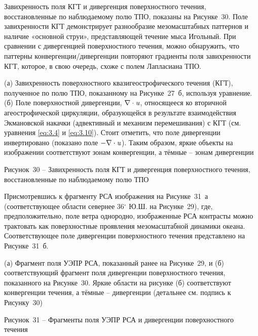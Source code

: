 Завихренность поля КГТ и дивергенция поверхностного течения, восстановленные по наблюдаемому полю ТПО, показаны на Рисунке~30. Поле завихренности КГТ демонстрирует разнообразие мезомасштабных паттернов и наличие «основной струи», представляющей течение мыса Игольный. При сравнении с дивергенцией поверхностного течения, можно обнаружить, что паттерны конвергенции/дивергенции повторяют градиенты поля завихренности КГТ, которое, в свою очередь, схоже с полем Лапласиана ТПО.



(а) Завихренность поверхностного квазигеострофического течения (КГТ), полученное по полю ТПО, показанному на Рисунке~27~б, используя уравнение. (б) Поле поверхностной дивергенции, $\nabla \cdot {\it u}$, относящееся ко вторичной агеострофической циркуляции, образующейся в результате взаимодействия Экмановской накачки (адвективный и механизм перемешивания) с КГТ (см. уравнения \eqref{eq:3.4} и \eqref{eq:3.10}). Стоит отметить, что поле дивергенции инвертировано (показано поле $-\nabla \cdot {\it u}$). Таким образом, яркие объекты на изображении соответствуют зонам конвергенции, а тёмные -- зонам дивергенции



Рисунок~30 -- Завихренность поля КГТ и дивергенция поверхностного течения, восстановленные по наблюдаемому полю ТПО



Присмотревшись к фрагменту РСА изображения на Рисунке~31~а (соответствующее области севернее 36${}^\circ$ Ю.Ш. на Рисунке~29), где, предположительно, поле ветра однородно, изображенные РСА контрасты можно трактовать как поверхностные проявления мезомасштабной динамики океана. Соответствующее поле дивергенции поверхностного течения представлено на Рисунке~31~б. 



(а) Фрагмент поля УЭПР РСА, показанный ранее на Рисунке~29, и (б) соответствующий фрагмент поля дивергенции поверхностного течения, показанного на Рисунке~30. Яркие области на рисунке (б) соответствуют конвергенции течения, а тёмные -- дивергенции (детальнее см. подпись к Рисунку~30)



Рисунок~31 -- Фрагменты поля УЭПР РСА и дивергенции поверхностного течения



